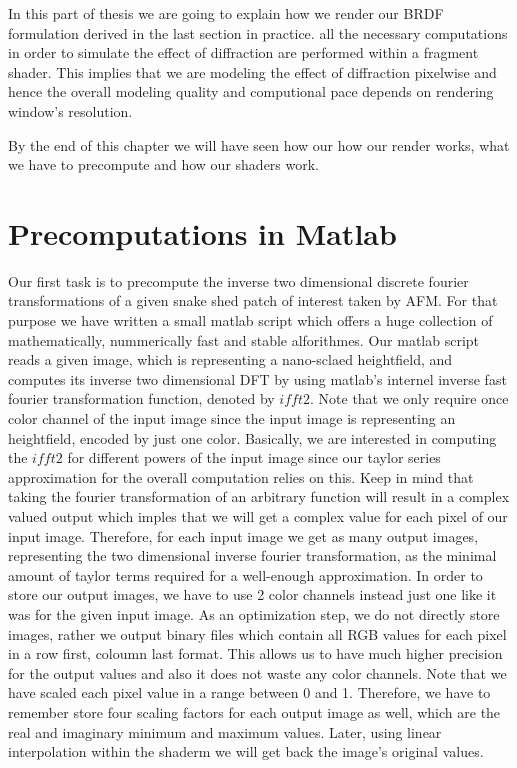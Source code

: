In this part of thesis we are going to explain how we render our BRDF formulation derived in the last section in practice. all the necessary computations in order to simulate the effect of diffraction are performed within a fragment shader. This implies that we are modeling the effect of diffraction pixelwise and hence the overall modeling quality and computional pace depends on rendering window's resolution.

By the end of this chapter we will have seen how our how our render works, what we have to precompute and how our shaders work. 


\section{Precomputations in Matlab}
Our first task is to precompute the inverse two dimensional discrete fourier transformations of a given snake shed patch of interest taken by AFM. For that purpose we have written a small matlab script which offers a huge collection of mathematically, nummerically fast and stable alforithmes. Our matlab script reads a given image, which is representing a nano-sclaed heightfield, and computes its inverse two dimensional DFT by using matlab's internel inverse fast fourier transformation function, denoted by $ifft2$. Note that we only require once color channel of the input image since the input image is representing an heightfield, encoded by just one color. Basically, we are interested in computing the $ifft2$ for different powers of the input image since our taylor series approximation for the overall computation relies on this. Keep in mind that taking the fourier transformation of an arbitrary function will result in a complex valued output which imples that we will get a complex value for each pixel of our input image. Therefore, for each input image we get as many output images, representing the two dimensional inverse fourier transformation, as the minimal amount of taylor terms required for a well-enough approximation. In order to store our output images, we have to use 2 color channels instead just one like it was for the given input image. As an optimization step, we do not directly store images, rather we output binary files which contain all RGB values for each pixel in a row first, coloumn last format. This allows us to have much higher precision for the output values and also it does not waste any color channels. Note that we have scaled each pixel value in a range between 0 and 1. Therefore, we have to remember store four scaling factors for each output image as well, which are the real and imaginary minimum and maximum values. Later, using linear interpolation within the shaderm we will get back the image's original values. 

